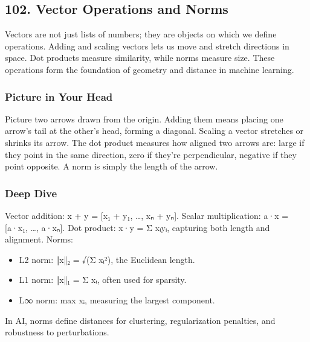 \documentclass[
  letterpaper,
  DIV=11,
  numbers=noendperiod]{scrreprt}
\providecommand{\tightlist}{%
  \setlength{\itemsep}{0pt}\setlength{\parskip}{0pt}}
\begin{document}
\subsection{102. Vector Operations and
Norms}\label{vector-operations-and-norms}

Vectors are not just lists of numbers; they are objects on which we
define operations. Adding and scaling vectors lets us move and stretch
directions in space. Dot products measure similarity, while norms
measure size. These operations form the foundation of geometry and
distance in machine learning.

\subsubsection{Picture in Your Head}\label{picture-in-your-head-101}

Picture two arrows drawn from the origin. Adding them means placing one
arrow's tail at the other's head, forming a diagonal. Scaling a vector
stretches or shrinks its arrow. The dot product measures how aligned two
arrows are: large if they point in the same direction, zero if they're
perpendicular, negative if they point opposite. A norm is simply the
length of the arrow.

\subsubsection{Deep Dive}\label{deep-dive-101}

Vector addition: x + y = {[}x₁ + y₁, \ldots, xₙ + yₙ{]}. Scalar
multiplication: a·x = {[}a·x₁, \ldots, a·xₙ{]}. Dot product: x·y = Σ
xᵢyᵢ, capturing both length and alignment. Norms:

\begin{itemize}
\tightlist
\item
  L2 norm: ‖x‖₂ = √(Σ xᵢ²), the Euclidean length.
\item
  L1 norm: ‖x‖₁ = Σ \textbar xᵢ\textbar, often used for sparsity.
\item
  L∞ norm: max \textbar xᵢ\textbar, measuring the largest component.
\end{itemize}

In AI, norms define distances for clustering, regularization penalties,
and robustness to perturbations.
\end{document}
